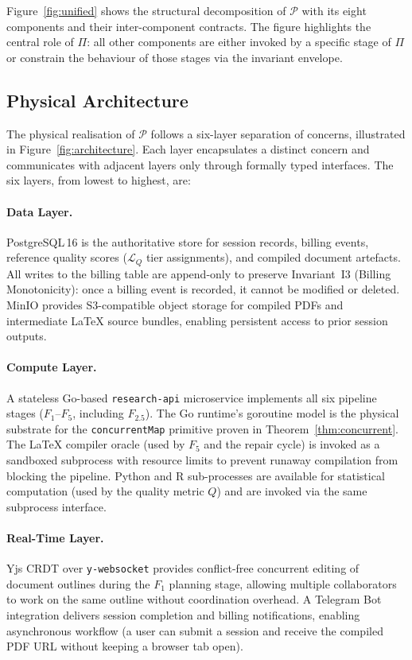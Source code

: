 Figure~\ref{fig:unified} shows the structural decomposition of $\mathcal{P}$ with its
eight components and their inter-component contracts.
The figure highlights the central role of $\Pi$: all other components are either
invoked by a specific stage of $\Pi$ or constrain the behaviour of those stages via
the invariant envelope.



\subsection{Physical Architecture}

The physical realisation of $\mathcal{P}$ follows a six-layer separation of concerns,
illustrated in Figure~\ref{fig:architecture}.
Each layer encapsulates a distinct concern and communicates with adjacent layers only
through formally typed interfaces.
The six layers, from lowest to highest, are:

\paragraph{Data Layer.}
PostgreSQL\,16 is the authoritative store for session records, billing events,
reference quality scores ($\mathcal{L}_Q$ tier assignments), and compiled document artefacts.
All writes to the billing table are append-only to preserve Invariant~I3 (Billing Monotonicity):
once a billing event is recorded, it cannot be modified or deleted.
MinIO provides S3-compatible object storage for compiled PDFs and intermediate
\LaTeX{} source bundles, enabling persistent access to prior session outputs.

\paragraph{Compute Layer.}
A stateless Go-based \texttt{research-api} microservice implements all six pipeline
stages ($F_1$--$F_5$, including $F_{2.5}$).
The Go runtime's goroutine model is the physical substrate for the
\texttt{concurrentMap} primitive proven in Theorem~\ref{thm:concurrent}.
The \LaTeX{} compiler oracle (used by $F_5$ and the \tvg{} repair cycle) is invoked
as a sandboxed subprocess with resource limits to prevent runaway compilation from
blocking the pipeline.
Python and R sub-processes are available for statistical computation (used by the
quality metric $Q$) and are invoked via the same subprocess interface.

\paragraph{Real-Time Layer.}
Yjs CRDT over \texttt{y-websocket} provides conflict-free concurrent editing of
document outlines during the $F_1$ planning stage, allowing multiple collaborators
to work on the same outline without coordination overhead.
A Telegram Bot integration delivers session completion and billing notifications,
enabling asynchronous workflow (a user can submit a session and receive the compiled
PDF URL without keeping a browser tab open).

